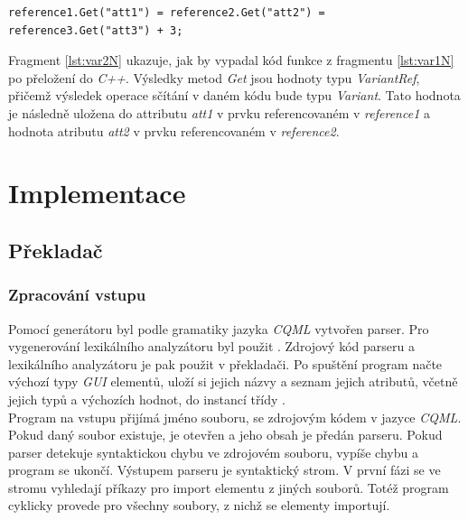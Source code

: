 \documentclass[11pt,twoside,a4paper]{book}
\begin{document}
{{\begin{ttemize}
{{\begin{lastlisting}[frame=single,caption=Řešení v pseudokódu problematického použití operátoru "." v přiřazovacím výroku,label=lst:var0N]
\begin{lstlisting}[frame=single,caption=Řešení v pseudokódu problematického použití operátoru "." v přiřazovacím výroku,label=lst:var2N]
reference1.Get("att1") = reference2.Get("att2") = reference3.Get("att3") + 3;
\end{lstlisting}
Fragment \ref{lst:var2N} ukazuje, jak by vypadal kód funkce z fragmentu \ref{lst:var1N} po přeložení do \textit{C++}. Výsledky metod \textit{Get} jsou hodnoty typu \textit{VariantRef}, přičemž výsledek operace sčítání v daném kódu bude typu \textit{Variant}. Tato hodnota je následně uložena do attributu \textit{att1} v prvku referencovaném v \textit{reference1} a hodnota atributu \textit{att2} v prvku referencovaném v \textit{reference2}.\\


\chapter{\label{CH:Impl}Implementace}

\section{\label{SEC:aa}Překladač}
\subsection{Zpracování vstupu}
Pomocí generátoru  byl podle gramatiky jazyka \textit{CQML} vytvořen parser. Pro vygenerování lexikálního analyzátoru byl použit . Zdrojový kód parseru a lexikálního analyzátoru je pak použit v překladači.
Po spuštění program načte výchozí typy \textit{GUI} elementů, uloží si jejich názvy a seznam jejich atributů, včetně jejich typů a výchozích hodnot, do instancí třídy .\\
Program na vstupu přijímá jméno souboru, se zdrojovým kódem v jazyce \textit{CQML}. Pokud daný soubor existuje, je otevřen a jeho obsah je předán parseru. Pokud parser detekuje syntaktickou chybu ve zdrojovém souboru, vypíše chybu a program se ukončí. Výstupem parseru je syntaktický strom. V první fázi se ve stromu vyhledají příkazy pro import elementu z jiných souborů. Totéž program cyklicky provede pro všechny soubory, z nichž se elementy importují.


\end{lastlisting}}}
\end{ttemize}}}
\end{document}
